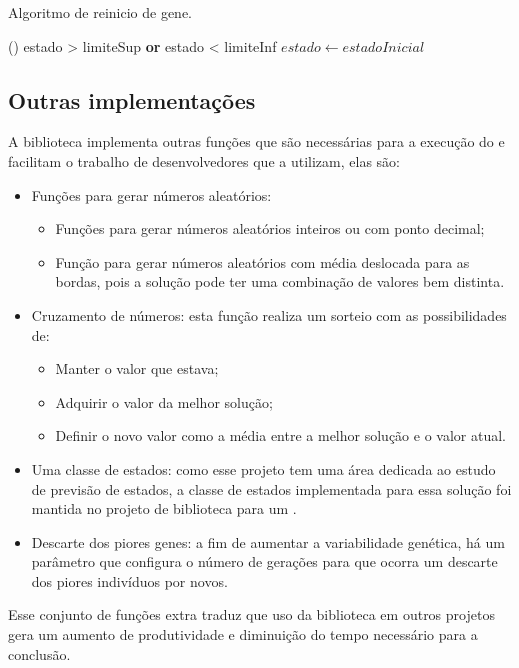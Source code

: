 \begin{algoritmo}
\caption{Algoritmo de reinicio de gene.}
\label{algoritmo:gene_reset}
    \If()
    {estado > limiteSup {\normalfont \textbf{or}} estado < limiteInf} {
        $estado \gets estadoInicial$
    }
\end{algoritmo}

\subsection{Outras implementações}

A biblioteca implementa outras funções que são necessárias para a execução do \SE e facilitam o trabalho de desenvolvedores que a utilizam, elas são:

\begin{itemize}
    \item Funções para gerar números aleatórios:
        \begin{itemize}
            \item Funções para gerar números aleatórios inteiros ou com ponto decimal;
            \item Função para gerar números aleatórios com média deslocada para as bordas, pois a solução pode ter uma combinação de valores bem distinta.
        \end{itemize}
    \item Cruzamento de números: esta função realiza um sorteio com as possibilidades de:
        \begin{itemize}
            \item Manter o valor que estava;
            \item Adquirir o valor da melhor solução;
            \item Definir o novo valor como a média entre a melhor solução e o valor atual.
        \end{itemize}
    \item Uma classe de estados: como esse projeto tem uma área dedicada ao estudo de previsão de estados, a classe de estados implementada para essa solução foi mantida no projeto de biblioteca para um \SE.
    \item Descarte dos piores genes: a fim de aumentar a variabilidade genética, há um parâmetro que configura o número de gerações para que ocorra um descarte dos piores indivíduos por novos.
\end{itemize}

Esse conjunto de funções extra traduz que uso da biblioteca em outros projetos gera um aumento de produtividade e diminuição do tempo necessário para a conclusão.

